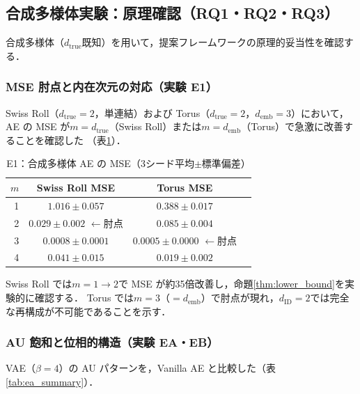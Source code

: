 \documentclass[11pt,a4paper]{jsarticle}
\newcommand{\dID}{d_{\mathrm{ID}}}
\newcommand{\dtrue}{d_{\mathrm{true}}}
\newcommand{\demb}{d_{\mathrm{emb}}}
\begin{document}
\subsection{合成多様体実験：原理確認（RQ1・RQ2・RQ3）}\label{sec:exp_synthetic}

合成多様体（$\dtrue$既知）を用いて，提案フレームワークの原理的妥当性を確認する．

\subsubsection{MSE 肘点と内在次元の対応（実験 E1）}

Swiss Roll（$\dtrue = 2$，単連結）および Torus（$\dtrue = 2$，$\demb = 3$）において，
AE の MSE が$m = \dtrue$（Swiss Roll）または$m = \demb$（Torus）で急激に改善することを確認した
（表\ref{tab:e1}）．

\begin{table}[H]
\centering
\caption{E1：合成多様体 AE の MSE（3シード平均$\pm$標準偏差）}
\label{tab:e1}
\small
\begin{tabular}{rccc}
\toprule
$m$ & Swiss Roll MSE & Torus MSE \\
\midrule
1 & $1.016\pm0.057$ & $0.388\pm0.017$ \\
2 & $\boldsymbol{0.029\pm0.002}$ $\leftarrow$肘点 & $0.085\pm0.004$ \\
3 & $0.0008\pm0.0001$ & $\boldsymbol{0.0005\pm0.0000}$ $\leftarrow$肘点 \\
4 & $0.041\pm0.015$ & $0.019\pm0.002$ \\
\bottomrule
\end{tabular}
\end{table}

Swiss Roll では$m = 1 \to 2$で MSE が約35倍改善し，命題\ref{thm:lower_bound}を実験的に確認する．
Torus では$m = 3$（$= \demb$）で肘点が現れ，$\dID = 2$では完全な再構成が不可能であることを示す．

\subsubsection{AU 飽和と位相的構造（実験 EA・EB）}

VAE（$\beta = 4$）の AU パターンを，Vanilla AE と比較した（表\ref{tab:ea_summary}）．
\end{document}
